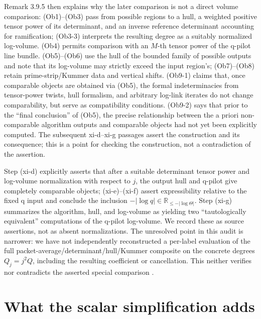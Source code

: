 \documentclass[11pt]{article}
\begin{document}
Remark 3.9.5 then explains why the later comparison is not a direct volume comparison: (Ob1)--(Ob3) pass from possible regions to a hull, a weighted positive tensor power of its determinant, and an inverse reference determinant accounting for ramification; (Ob3-3) interprets the resulting degree as a suitably normalized log-volume. (Ob4) permits comparison with an $M$-th tensor power of the q-pilot line bundle. (Ob5)--(Ob6) use the hull of the bounded family of possible outputs and note that its log-volume may strictly exceed the input region's; (Ob7)--(Ob8) retain prime-strip/Kummer data and vertical shifts. (Ob9-1) claims that, once comparable objects are obtained via (Ob5), the formal indeterminacies from tensor-power twists, hull formalism, and arbitrary log-link iterates do not change comparability, but serve as compatibility conditions. (Ob9-2) says that prior to the ``final conclusion'' of (Ob5), the precise relationship between the a priori non-comparable algorithm outputs and comparable objects had not yet been explicitly computed. The subsequent xi-d--xi-g passages assert the construction and its consequence; this is a point for checking the construction, not a contradiction of the assertion.

Step (xi-d) explicitly asserts that after a suitable determinant tensor power and log-volume normalization with respect to $j$, the output hull and q-pilot give completely comparable objects; (xi-e)--(xi-f) assert expressibility relative to the fixed q input and conclude the inclusion $-|\log q|\in\mathbb R_{\leq-|\log\Theta|}$. Step (xi-g) summarizes the algorithm, hull, and log-volume as yielding two ``tautologically equivalent'' computations of the q-pilot log-volume. We record these as source assertions, not as absent normalizations. The unresolved point in this audit is narrower: we have not independently reconstructed a per-label evaluation of the full packet-average/determinant/hull/Kummer composite on the concrete degrees $Q_j=j^2Q$, including the resulting coefficient or cancellation. This neither verifies nor contradicts the asserted special comparison \cite[Remark 3.1.1(ii)--(iv), pp.~94--97; Proposition 3.4(ii), pp.~102--103; Proposition 3.9(i), Remark 3.9.3, pp.~116--120; Remark 3.9.5(Ob1)--(Ob9), pp.~127--139; Corollary 3.12(xi-c)--(xi-g), pp.~183--185]{MochizukiIUTIII}.
\section{What the scalar simplification adds}\label{sec:identity-simplification}
\end{document}

